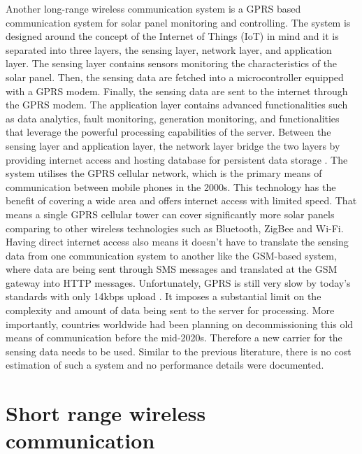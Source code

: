 \documentclass[../thesis.tex]{subfiles}
\begin{document}
Another long-range wireless communication system is a GPRS based communication system for solar panel monitoring and controlling. The system is designed around the concept of the Internet of Things (IoT) in mind and it is separated into three layers, the sensing layer, network layer, and application layer. The sensing layer contains sensors monitoring the characteristics of the solar panel. Then, the sensing data are fetched into a microcontroller equipped with a GPRS modem. Finally, the sensing data are sent to the internet through the GPRS modem. The application layer contains advanced functionalities such as data analytics, fault monitoring, generation monitoring, and functionalities that leverage the powerful processing capabilities of the server. Between the sensing layer and application layer, the network layer bridge the two layers by providing internet access and hosting database for persistent data storage \cite{AdhyaSoham2016AIbs}. The system utilises the GPRS cellular network, which is the primary means of communication between mobile phones in the 2000s. This technology has the benefit of covering a wide area and offers internet access with limited speed. That means a single GPRS cellular tower can cover significantly more solar panels comparing to other wireless technologies such as Bluetooth, ZigBee and Wi-Fi. Having direct internet access also means it doesn't have to translate the sensing data from one communication system to another like the GSM-based system, where data are being sent through SMS messages and translated at the GSM gateway into HTTP messages. Unfortunately, GPRS is still very slow by today's standards with only 14kbps upload \cite{3gpp.org}. It imposes a substantial limit on the complexity and amount of data being sent to the server for processing. More importantly, countries worldwide had been planning on decommissioning this old means of communication before the mid-2020s. Therefore a new carrier for the sensing data needs to be used. Similar to the previous literature, there is no cost estimation of such a system and no performance details were documented.


\section{Short range wireless communication}
\end{document}
